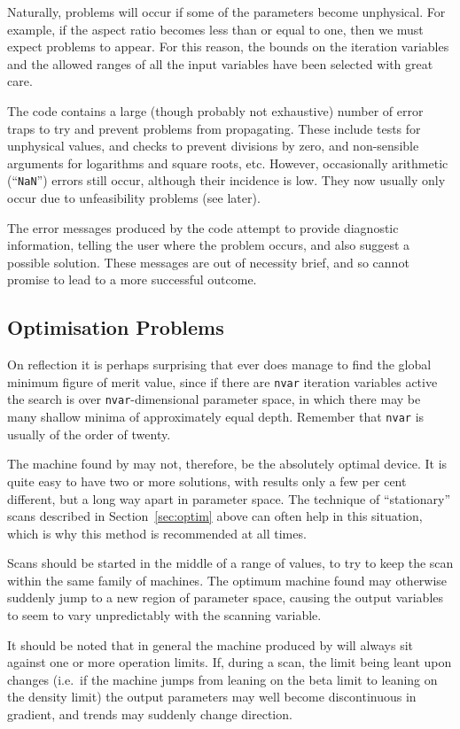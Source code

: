 Naturally, problems will occur if some of the parameters become unphysical.
For example, if the aspect ratio becomes less than or equal to one, then we
must expect problems to appear. For this reason, the bounds on the iteration
variables and the allowed ranges of all the input variables have been selected
with great care.

The code contains a large (though probably not exhaustive) number of error
traps to try and prevent problems from propagating. These include tests for
unphysical values, and checks to prevent divisions by zero, and non-sensible
arguments for logarithms and square roots, etc. However, occasionally
arithmetic (``{\tt NaN}'') errors still occur, although their incidence is
low. They now usually only occur due to unfeasibility problems (see later).

The error messages produced by the code attempt to provide diagnostic
information, telling the user where the problem occurs, and also suggest a
possible solution. These messages are out of necessity brief, and so cannot
promise to lead to a more successful outcome.

\subsection{Optimisation Problems}

On reflection it is perhaps surprising that \PS ever does manage to find the
global minimum figure of merit value, since if there are {\tt nvar} iteration
variables active the search is over {\tt nvar}-dimensional parameter space, in
which there may be many shallow minima of approximately equal depth. Remember
that {\tt nvar} is usually of the order of twenty.

The machine found by \PS may not, therefore, be the absolutely optimal
device. It is quite easy to have two or more solutions, with results only a
few per cent different, but a long way apart in parameter space. The technique
of ``stationary'' scans described in Section~\ref{sec:optim} above can often
help in this situation, which is why this method is recommended at all times.

Scans should be started in the middle of a range of values, to try to keep the
scan within the same family of machines. The optimum machine found may
otherwise suddenly jump to a new region of parameter space, causing the output
variables to seem to vary unpredictably with the scanning variable.

It should be noted that in general the machine produced by \PS will always sit
against one or more operation limits. If, during a scan, the limit being leant
upon changes (i.e.\ if the machine jumps from leaning on the beta limit to
leaning on the density limit) the output parameters may well become
discontinuous in gradient, and trends may suddenly change direction.


